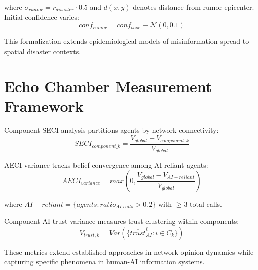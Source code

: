 \documentclass[pdflatex,sn-apa]{sn-jnl}%
\begin{document}
\begin{appendices}
where $\sigma_{rumor} = r_{disaster} \cdot 0.5$ and $d(x,y)$ denotes distance from rumor epicenter. Initial confidence varies:
\begin{equation}
conf_{rumor} = conf_{base} + \mathcal{N}(0, 0.1)
\end{equation}

This formalization extends epidemiological models of misinformation spread \citep{vosoughi2018spread} to spatial disaster contexts.

\section{Echo Chamber Measurement Framework}

Component SECI analysis partitions agents by network connectivity:
\begin{equation}
SECI_{component\_k} = \frac{V_{global} - V_{component\_k}}{V_{global}}
\end{equation}

AECI-variance tracks belief convergence among AI-reliant agents:
\begin{equation}
AECI_{variance} = max(0, \frac{V_{global} - V_{AI-reliant}}{V_{global}})
\end{equation}

where $AI-reliant = \{agents: ratio_{AI\_calls} > 0.2\}$ with $\geq 3$ total calls.

Component AI trust variance measures trust clustering within components:
\begin{equation}
V_{trust,k} = Var(\{\overline{trust}_{AI}^{i} : i \in C_k\})
\end{equation}

These metrics extend established approaches in network opinion dynamics \citep{friedkin1999social} while capturing specific phenomena in human-AI information systems.





\end{appendices}


\end{document}
